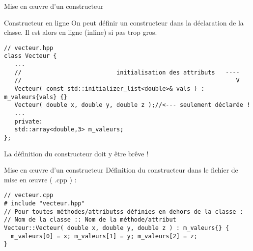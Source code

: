 \documentclass[handout,10pt]{beamer}
\begin{document}
\begin{frame}[fragile]{Mise en {\oe}uvre d'un constructeur}
\tiny
\begin{block}{Constructeur en ligne}
On peut définir un constructeur dans la déclaration de la classe. Il est alors en ligne (inline) si pas trop gros.
\begin{lstlisting}
// vecteur.hpp
class Vecteur {
   ...
   //                           initialisation des attributs   ---- 
   //                                                             V
   Vecteur( const std::initializer_list<double>& vals ) : m_valeurs{vals} {}   
   Vecteur( double x, double y, double z );//<--- seulement déclarée !
   ...
   private:
   std::array<double,3> m_valeurs;
};
\end{lstlisting}
La définition du constructeur doit y être brêve !
\end{block}

\begin{block}{Mise en {\oe}uvre d'un constructeur}
Définition du constructeur dans le fichier de mise en {\oe}uvre ( .cpp ) :
\begin{lstlisting}
// vecteur.cpp
# include "vecteur.hpp"
// Pour toutes méthodes/attributss définies en dehors de la classe :
// Nom de la classe :: Nom de la méthode/attribut
Vecteur::Vecteur( double x, double y, double z ) : m_valeurs{} {
  m_valeurs[0] = x; m_valeurs[1] = y; m_valeurs[2] = z;
}
\end{lstlisting}

\end{block}
\end{frame}
\end{document}
